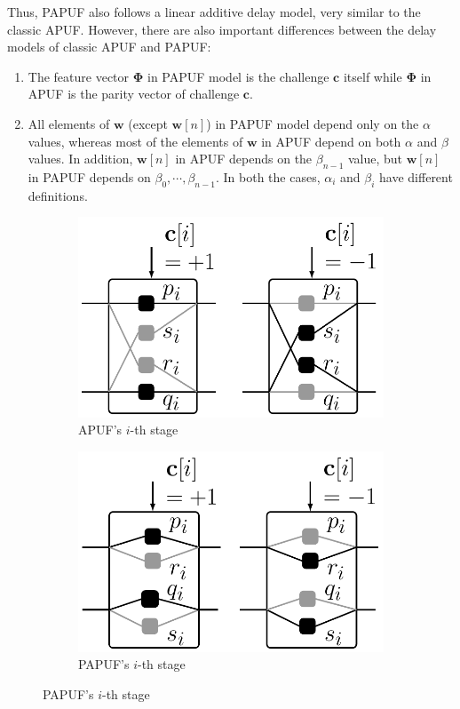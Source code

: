 \documentclass{article}
\newcommand{\vect}[1]{\mathbf{#1}}
\begin{document}
\begin{questions}
{Thus, PAPUF also follows a linear additive delay model, 
very similar to the classic APUF. However, there are
also important differences between the delay models of classic APUF 
and PAPUF:
\begin{enumerate}
\item The feature vector $\vect{\Phi}$ in PAPUF model is the challenge $\vect{c}$ 
itself while $\vect{\Phi}$ in APUF is the parity vector of challenge $\vect{c}$.
\item All elements of $\vect{w}$ (except $\vect{w}[n]$) in PAPUF model depend only on 
the $\alpha$ values, whereas most of the elements of $\vect{w}$ in APUF depend on both $\alpha$ 
and $\beta$ values. In addition, $\vect{w}[n]$ in APUF depends on the $\beta_{n-1}$ value, but 
$\vect{w}[n]$ in PAPUF depends on $\beta_0, \cdots, \beta_{n-1}$. In both the cases, $\alpha_i$ and $\beta_i$ have different definitions.
 \end{enumerate}}



\begin{figure}
\centering

\begin{subfigure}[b]{.4\textwidth}
\centering
\includegraphics[width=.6\textwidth]{apuf_stage_delays_chal.pdf}

\caption{APUF's $i$-th stage}
\end{subfigure}%
\begin{subfigure}[b]{.4\textwidth}
\centering
\includegraphics[width=.6\textwidth]{apuf_pdl_stage_delays_chal.pdf}
\caption{PAPUF's $i$-th stage}
\end{subfigure}


\end{figure}
\end{questions}
\end{document}
